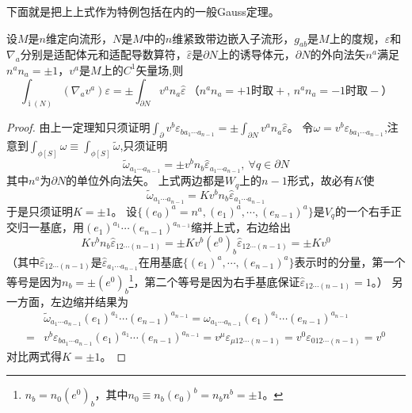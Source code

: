 下面就是把上上式作为特例包括在内的一般Gauss定理。

\begin{theorem}
    设$M$是$n$维定向流形，$N$是$M$中的$n$维紧致带边嵌入子流形，$g_{ab}$是$M$上的度规，$\varepsilon$和$\nabla_a$分别是适配体元和适配导数算符，$\hat\varepsilon$是$\partial N$上的诱导体元，$\partial N$的外向法矢$n^a$满足$n^an_a = \pm 1$，$v^a$是$M$上的$C^1$矢量场,则
    $$\int_{\operatorname{i}(N)}(\nabla_av^a)\varepsilon = \pm \int_{\partial N}v^an_a\hat\varepsilon ~ \text{（$n^an_a = +1$时取$+$, $n^an_a = -1$时取$-$）}$$
\end{theorem}

\begin{proof}
    由上一定理知只须证明$\displaystyle\int_{\partial}v^b\varepsilon_{ba_1 \cdots a_{n - 1}} = \pm \int_{\partial N}v^an_a\hat\varepsilon$。
    令$\omega = v^b\varepsilon_{ba_1 \cdots a_{n - 1}}$,注意到$\displaystyle\int_{\phi[S]}\omega \equiv \int_{\phi[S]}\tilde\omega$,只须证明
    $$\tilde\omega_{a_1 \cdots a_{n - 1}} = \pm v^bn_b\hat\varepsilon_{a_1 \cdots a_{n - 1}}, ~ \forall q \in \partial N$$
    其中$n^a$为$\partial N$的单位外向法矢。
    上式两边都是$W_q$上的$n - 1$形式，故必有$K$使
    $$\tilde\omega_{a_1 \cdots a_{n - 1}} = K v^bn_b\hat\varepsilon_{a_1 \cdots a_{n - 1}}$$
    于是只须证明$K = \pm 1$。
    设$\{(e_0)^a = n^a, (e_1)^a, \cdots, (e_{n - 1})^a\}$是$V_q$的一个右手正交归一基底，用$(e_1)^{a_1} \cdots (e_{n - 1})^{a_{n - 1}}$缩并上式，右边给出
    $$Kv^bn_b\hat\varepsilon_{12\cdots(n - 1)} = \pm Kv^b(e^0)_b\hat\varepsilon_{12\cdots(n - 1)} = \pm K v^0$$
    （其中$\hat\varepsilon_{12\cdots(n - 1)}$是$\hat\varepsilon_{a_1 \cdots a_{n - 1}}$在用基底$\{(e_1)^a, \cdots, (e_{n - 1})^a\}$表示时的分量，第一个等号是因为$n_b = \pm(e^0)_b$\footnote{
        $n_b = n_0(e^0)_b$，其中$n_0 \equiv n_b(e_0)^b = n_bn^b = \pm 1$。
    }，第二个等号是因为右手基底保证$\hat\varepsilon_{12\cdots(n - 1)} = 1$。）
    另一方面，左边缩并结果为
    \[\begin{split}
        & \tilde\omega_{a_1 \cdots a_{n - 1}}(e_1)^{a_1} \cdots (e_{n - 1})^{a_{n - 1}} = \omega_{a_1 \cdots a_{n - 1}}(e_1)^{a_1} \cdots (e_{n - 1})^{a_{n - 1}} \\
        = & v^b\varepsilon_{b a_1 \cdots a_{n - 1}}(e_1)^{a_1} \cdots (e_{n - 1})^{a_{n - 1}} = v^\mu\varepsilon_{\mu 1 2 \cdots (n - 1)} = v^0\varepsilon_{0 1 2 \cdots (n - 1)} = v^0
    \end{split}\]
    对比两式得$K = \pm 1$。
\end{proof}

